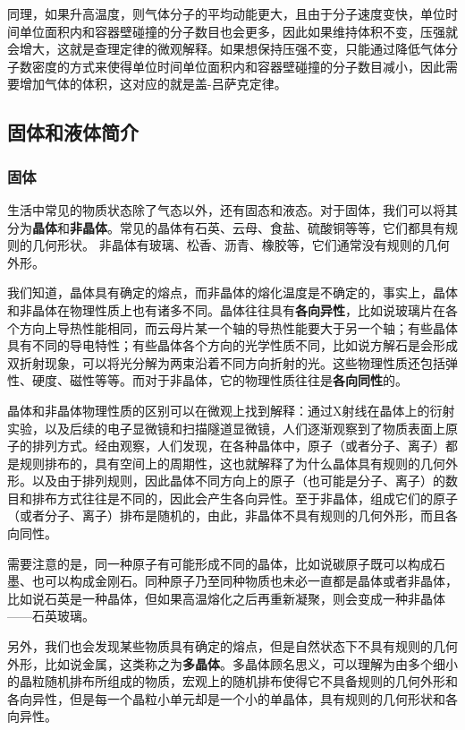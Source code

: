  同理，如果升高温度，则气体分子的平均动能更大，且由于分子速度变快，单位时间单位面积内和容器壁碰撞的分子数目也会更多，因此如果维持体积不变，压强就会增大，这就是查理定律的微观解释。如果想保持压强不变，只能通过降低气体分子数密度的方式来使得单位时间单位面积内和容器壁碰撞的分子数目减小，因此需要增加气体的体积，这对应的就是盖-吕萨克定律。

\subsection{固体和液体简介}
\subsubsection{固体}
生活中常见的物质状态除了气态以外，还有固态和液态。对于固体，我们可以将其分为\textbf{晶体}和\textbf{非晶体}。常见的晶体有石英、云母、食盐、硫酸铜等等，它们都具有规则的几何形状。
非晶体有玻璃、松香、沥青、橡胶等，它们通常没有规则的几何外形。

我们知道，晶体具有确定的熔点，而非晶体的熔化温度是不确定的，事实上，晶体和非晶体在物理性质上也有诸多不同。晶体往往具有\textbf{各向异性}，比如说玻璃片在各个方向上导热性能相同，而云母片某一个轴的导热性能要大于另一个轴；有些晶体具有不同的导电特性；有些晶体各个方向的光学性质不同，比如说方解石是会形成双折射现象，可以将光分解为两束沿着不同方向折射的光。这些物理性质还包括弹性、硬度、磁性等等。而对于非晶体，它的物理性质往往是\textbf{各向同性}的。

晶体和非晶体物理性质的区别可以在微观上找到解释：通过X射线在晶体上的衍射实验，以及后续的电子显微镜和扫描隧道显微镜，人们逐渐观察到了物质表面上原子的排列方式。经由观察，人们发现，在各种晶体中，原子（或者分子、离子）都是规则排布的，具有空间上的周期性，这也就解释了为什么晶体具有规则的几何外形。以及由于排列规则，因此晶体不同方向上的原子（也可能是分子、离子）的数目和排布方式往往是不同的，因此会产生各向异性。至于非晶体，组成它们的原子（或者分子、离子）排布是随机的，由此，非晶体不具有规则的几何外形，而且各向同性。

需要注意的是，同一种原子有可能形成不同的晶体，比如说碳原子既可以构成石墨、也可以构成金刚石。同种原子乃至同种物质也未必一直都是晶体或者非晶体，比如说石英是一种晶体，但如果高温熔化之后再重新凝聚，则会变成一种非晶体——石英玻璃。

另外，我们也会发现某些物质具有确定的熔点，但是自然状态下不具有规则的几何外形，比如说金属，这类称之为\textbf{多晶体}。多晶体顾名思义，可以理解为由多个细小的晶粒随机排布所组成的物质，宏观上的随机排布使得它不具备规则的几何外形和各向异性，但是每一个晶粒小单元却是一个小的单晶体，具有规则的几何形状和各向异性。

